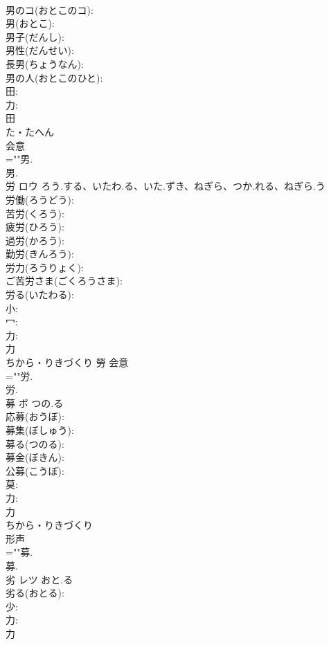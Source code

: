 \documentclass[8pt]{extreport}
\begin{document}
\begin{CJK}{UTF8}{min}
\\	男のコ(おとこのコ): 
\\	男(おとこ): 
\\	男子(だんし): 
\\	男性(だんせい): 
\\	長男(ちょうなん): 
\\	男の人(おとこのひと): 
\\	田: 
\\	力: 
\\	田	
\\	た・たへん	
\\	会意 
\\	=""男.
\\	男.
\\	労	ロウ	ろう.する、いたわ.る、いた.ずき、ねぎら、つか.れる、ねぎら.う		
\\	労働(ろうどう): 
\\	苦労(くろう): 
\\	疲労(ひろう): 
\\	過労(かろう): 
\\	勤労(きんろう): 
\\	労力(ろうりょく): 
\\	ご苦労さま(ごくろうさま): 
\\	労る(いたわる): 
\\	小: 
\\	冖: 
\\	力: 
\\	力	
\\	ちから・りきづくり	勞	会意 
\\	=""労.
\\	労.
\\	募	ボ	つの.る		
\\	応募(おうぼ): 
\\	募集(ぼしゅう): 
\\	募る(つのる): 
\\	募金(ぼきん): 
\\	公募(こうぼ): 
\\	莫: 
\\	力: 
\\	力	
\\	ちから・りきづくり	
\\	形声 
\\	=""募.
\\	募.
\\	劣	レツ	おと.る		
\\	劣る(おとる): 
\\	少: 
\\	力: 
\\	力	

\end{CJK}
\end{document}
